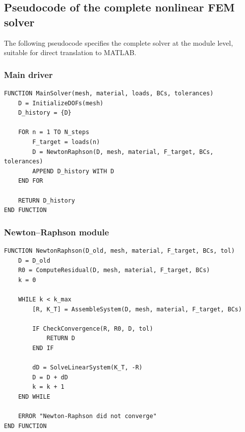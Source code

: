 \documentclass[11pt]{article}
\begin{document}
\subsection{Pseudocode of the complete nonlinear FEM solver}
\label{ssec:pseudocode}

The following pseudocode specifies the complete solver at the module
level, suitable for direct translation to MATLAB.

\subsubsection{Main driver}
\begin{verbatim}
FUNCTION MainSolver(mesh, material, loads, BCs, tolerances)
    D = InitializeDOFs(mesh)
    D_history = {D}

    FOR n = 1 TO N_steps
        F_target = loads(n)
        D = NewtonRaphson(D, mesh, material, F_target, BCs, tolerances)
        APPEND D_history WITH D
    END FOR

    RETURN D_history
END FUNCTION
\end{verbatim}

\subsubsection{Newton--Raphson module}
\begin{verbatim}
FUNCTION NewtonRaphson(D_old, mesh, material, F_target, BCs, tol)
    D = D_old
    R0 = ComputeResidual(D, mesh, material, F_target, BCs)
    k = 0

    WHILE k < k_max
        [R, K_T] = AssembleSystem(D, mesh, material, F_target, BCs)

        IF CheckConvergence(R, R0, D, tol)
            RETURN D
        END IF

        dD = SolveLinearSystem(K_T, -R)
        D = D + dD
        k = k + 1
    END WHILE

    ERROR "Newton-Raphson did not converge"
END FUNCTION
\end{verbatim}
\end{document}
